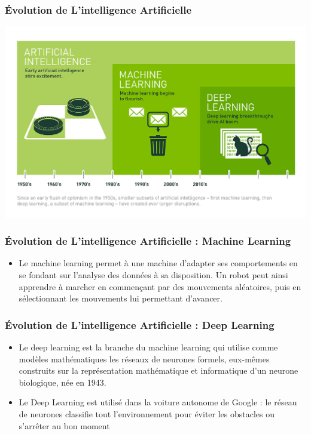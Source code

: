 \documentclass{beamer}
\begin{document}
	\begin{frame}[fragile]
	\frametitle{Évolution de L'intelligence  Artificielle}
	
	\centerline{\includegraphics{evolution.png}}
	
	\end{frame}
	
	\begin{frame}[fragile]
	\frametitle{Évolution de L'intelligence  Artificielle : Machine Learning}
	\begin{itemize}
		\item Le machine learning permet à une machine d’adapter ses comportements en se fondant sur 				l’analyse des données à sa disposition. Un robot peut ainsi apprendre à marcher en commençant par 			des mouvements aléatoires, puis en sélectionnant les mouvements lui permettant d’avancer.
	\end{itemize}
	\end{frame}
	
	\begin{frame}[fragile]
	\frametitle{Évolution de L'intelligence  Artificielle : Deep Learning}
	\begin{itemize}
		\itemsep1em
		\item Le deep learning est la branche du machine learning qui utilise comme modèles mathématiques 			les réseaux de neurones formels, eux-mêmes construits sur la représentation mathématique et 					informatique d’un neurone biologique, née en 1943.
		\item  Le Deep Learning est utilisé dans la voiture autonome  de Google : le réseau de  neurones 					classifie tout l’environnement pour éviter les obstacles ou s’arrêter au bon moment 
	\end{itemize}
	\end{frame}
	
\end{document}

